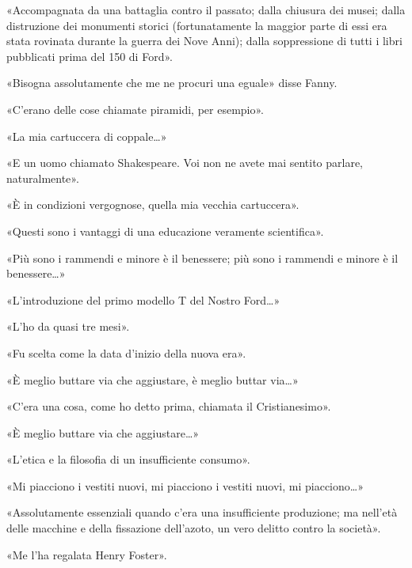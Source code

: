\documentclass[
a5paper, %
10pt, %
twoside, 
onecolumn, %
openany, %
]{memoir}
\renewenvironment{shaded}{%
  \def\FrameCommand{\fboxsep=\FrameSep \colorbox{shadecolor}}%
  \MakeFramed{\advance\hsize-\width \FrameRestore\FrameRestore}}%
 {\endMakeFramed}
\begin{document}
«Accompagnata da una battaglia contro il passato; dalla chiusura dei musei; dalla distruzione dei monumenti storici (fortunatamente la maggior parte di essi era stata rovinata durante la guerra dei Nove Anni); dalla soppressione di tutti i libri pubblicati prima del 150 di Ford».

\begin{shaded}
    «Bisogna assolutamente che me ne procuri una eguale» disse Fanny.
\end{shaded}

«C’erano delle cose chiamate piramidi, per esempio».

\begin{shaded}
    «La mia cartuccera di coppale…»
\end{shaded}

«E un uomo chiamato Shakespeare. Voi non ne avete mai sentito parlare, naturalmente».

\begin{shaded}
    «È in condizioni vergognose, quella mia vecchia cartuccera».
\end{shaded}

«Questi sono i vantaggi di una educazione veramente scientifica».

«Più sono i rammendi e minore è il benessere; più sono i rammendi e minore è il benessere…»

«L’introduzione del primo modello T del Nostro Ford…»

\begin{shaded}
    «L’ho da quasi tre mesi».
\end{shaded}

«Fu scelta come la data d’inizio della nuova era».

«È meglio buttare via che aggiustare, è meglio buttar via…»

«C’era una cosa, come ho detto prima, chiamata il Cristianesimo».

«È meglio buttare via che aggiustare…»

«L’etica e la filosofia di un insufficiente consumo».

«Mi piacciono i vestiti nuovi, mi piacciono i vestiti nuovi, mi piacciono…»

«Assolutamente essenziali quando c’era una insufficiente produzione; ma nell’età delle macchine e della fissazione dell’azoto, un vero delitto contro la società».

\begin{shaded}
    «Me l’ha regalata Henry Foster».
\end{shaded}
\end{document}
